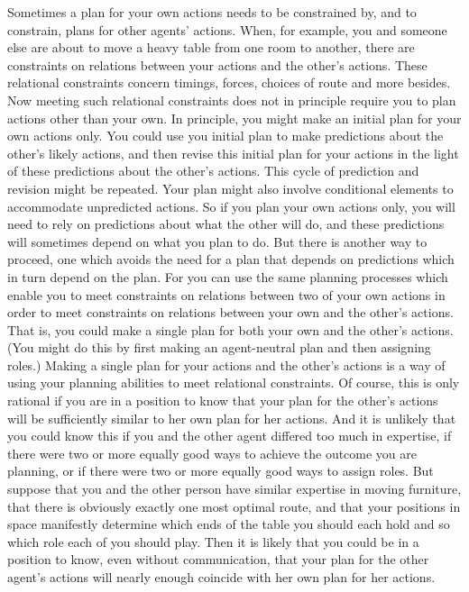 \documentclass[12pt,\papersize]{extarticle}
\begin{document}
Sometimes a plan for your own actions needs to be constrained by, and to constrain, plans for other agents' actions.
When, for example,
you and someone else are about to move a heavy table from one room to another,
there are constraints 
on relations between
	your actions
	and
	the other's actions.
These relational constraints concern timings, forces, choices of route and more besides.
Now meeting such relational constraints does not in principle require you to plan actions other than your own.
In principle,  you  might make an initial plan for your own actions only.
You could use you initial plan to make predictions about the  other's likely actions,
and then revise this initial plan for your actions in the light of these predictions about the other's actions.
This cycle of prediction and revision might be repeated.
Your plan might also involve conditional elements to accommodate unpredicted actions.
So if you plan your own actions only,
 you will need to rely on predictions about what the other will do,
 and these predictions will sometimes depend on what you plan to do.
But there is another way to proceed,
one which avoids the need for a plan that depends on predictions which in turn depend on the plan.
For you can use the same planning processes which enable you to meet constraints on relations between two of your own actions
	in order to meet constraints on relations between your own and the other's actions.
That is, you could make a single plan for both your own and the other's actions.
(You might do this by first making an agent-neutral plan and then assigning roles.)
Making a single plan for your actions and the other's actions is a way of using your planning abilities to meet relational constraints.
Of course, 
this is only rational  if you are in a position to know that your plan for the other's actions will be sufficiently similar to her own plan for her actions.
And it is unlikely that you could know this if 
	you and the other agent differed too much in expertise,
	if there were two or more equally good ways to achieve the outcome you are planning,
	or if there were two or more equally good ways to assign roles.
But suppose that you and the other person have similar expertise in moving furniture, 
	that there is obviously exactly one most optimal route,
	 and that your positions in space manifestly determine which ends of the table you should each hold and so which role each of you should play. 
Then it is likely that you could  be in a position to know,
	even without communication,
	that your plan for the other agent's actions will nearly enough coincide with her own plan for her actions.
\end{document}
